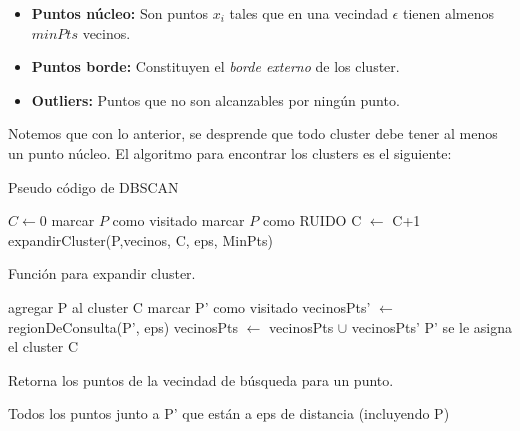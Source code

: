 \begin{itemize}
    \item \textbf{Puntos núcleo:} Son puntos $x_i$ tales que en una vecindad $\epsilon$ tienen almenos $minPts$ vecinos.
    \item \textbf{Puntos borde:} Constituyen el \textit{borde externo} de los cluster.
    \item \textbf{Outliers:} Puntos que no son alcanzables por ningún punto.
\end{itemize}

Notemos que con lo anterior, se desprende que todo cluster debe tener al menos un punto núcleo.
El algoritmo para encontrar los clusters es el siguiente:


\begin{algorithm}[H]
  \caption{Pseudo código de DBSCAN
    \label{DBSCAN}}
  \begin{algorithmic}[1]
      \State $C \gets 0$\;
      \State marcar $P$ como visitado
        \State marcar $P$ como RUIDO
        \Else
        \State C $\gets$ C+1
        \State expandirCluster(P,vecinos, C, eps, MinPts)
        \EndIf
      \EndFor
    \EndFunction
  \end{algorithmic}
\end{algorithm}


\begin{algorithm}[H]
  \caption{Función para expandir cluster.
    \label{alg:expandirCluster}}
  \begin{algorithmic}[1]
  \State agregar P al cluster C
         \State marcar P' como visitado\;
         \State vecinosPts' $\gets$ regionDeConsulta(P', eps)\;
            \State vecinosPts $\gets$ vecinosPts $\cup$ vecinosPts'
        \EndIf
    \EndIf
         \State P' se le asigna el cluster C
    \EndIf
    \EndFor
    \EndFunction
  \end{algorithmic}
\end{algorithm}


\begin{algorithm}[H]
  \caption{Retorna los puntos de la vecindad de búsqueda para un punto.
    \label{alg:regionDeConsulta}}
  \begin{algorithmic}[1]
    
    \Return Todos los puntos junto a P' que están a eps de distancia (incluyendo P)
    \EndFunction
  \end{algorithmic}
\end{algorithm}


